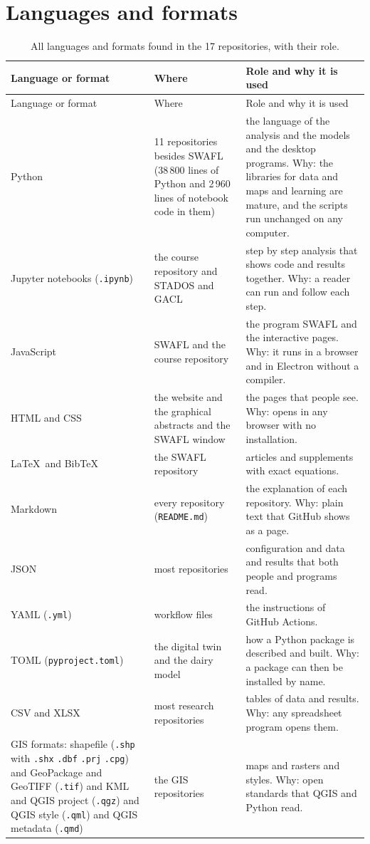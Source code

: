 \documentclass[11pt,a4paper]{article}
\begin{document}
\section{Languages and formats}
\begin{longtable}{@{}R{3.4cm}R{4.6cm}R{7.0cm}@{}}
\caption{All languages and formats found in the 17 repositories, with their role.}\label{tab:lang}\\
\toprule Language or format & Where & Role and why it is used\\\midrule\endfirsthead
\toprule Language or format & Where & Role and why it is used\\\midrule\endhead
Python & 11 repositories besides SWAFL (38\,800 lines of Python and 2\,960 lines of notebook code in them) & the language of the analysis and the models and the desktop programs. Why: the libraries for data and maps and learning are mature, and the scripts run unchanged on any computer.\\
Jupyter notebooks (\texttt{.ipynb}) & the course repository and STADOS and GACL & step by step analysis that shows code and results together. Why: a reader can run and follow each step.\\
JavaScript & SWAFL and the course repository & the program SWAFL and the interactive pages. Why: it runs in a browser and in Electron without a compiler.\\
HTML and CSS & the website and the graphical abstracts and the SWAFL window & the pages that people see. Why: opens in any browser with no installation.\\
\LaTeX\ and BibTeX & the SWAFL repository & articles and supplements with exact equations.\\
Markdown & every repository (\texttt{README.md}) & the explanation of each repository. Why: plain text that GitHub shows as a page.\\
JSON & most repositories & configuration and data and results that both people and programs read.\\
YAML (\texttt{.yml}) & workflow files & the instructions of GitHub Actions.\\
TOML (\texttt{pyproject.toml}) & the digital twin and the dairy model & how a Python package is described and built. Why: a package can then be installed by name.\\
CSV and XLSX & most research repositories & tables of data and results. Why: any spreadsheet program opens them.\\
GIS formats: shapefile (\texttt{.shp} with \texttt{.shx} \texttt{.dbf} \texttt{.prj} \texttt{.cpg}) and GeoPackage and GeoTIFF (\texttt{.tif}) and KML and QGIS project (\texttt{.qgz}) and QGIS style (\texttt{.qml}) and QGIS metadata (\texttt{.qmd}) & the GIS repositories & maps and rasters and styles. Why: open standards that QGIS and Python read.\\

\end{longtable}
\end{document}
